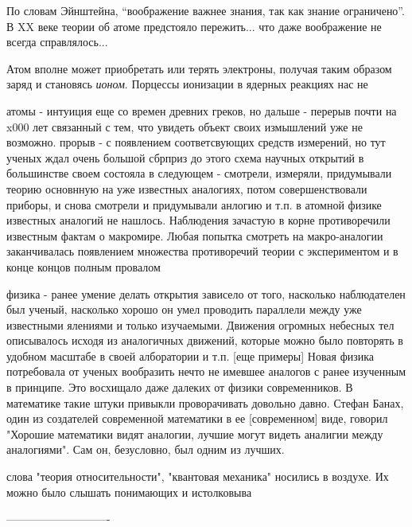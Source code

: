 По словам Эйнштейна, ``воображение важнее знания, так как знание ограничено''.
В XX веке теории об атоме предстояло пережить... что даже воображение не всегда справлялось...


Атом вполне может приобретать или терять электроны, получая таким образом заряд и становясь \textit{ионом}.
Порцессы ионизации в ядерных реакциях нас не 



атомы - интуиция еще со времен древних греков, но дальше - перерыв почти на x000 лет связанный с тем, что увидеть объект своих измышлений уже не возможно.
прорыв - с появлением соответсвующих средств измерений, но тут ученых ждал очень большой сбрприз
до этого схема научных открытий в большинстве своем состояла в следующем - смотрели, измеряли, придумывали теорию основнную на уже известных аналогиях, потом совершенствовали приборы, и снова смотрели и придумывали анлогию и т.п.
в атомной физике известных аналогий не нашлось. Наблюдения зачастую в корне противоречили известным фактам о макромире. Любая попытка смотреть на макро-аналогии заканчивалась появлением множества противоречий теории с экспериментом и в конце концов полным провалом 


физика - ранее умение делать открытия зависело от того, насколько наблюдателен был ученый, насколько хорошо он умел проводить параллели между уже известными ялениями и только изучаемыми.
Движения огромных небесных тел описывалось исходя из аналогичных движений, которые можно было повторять в удобном масштабе в своей алборатории и т.п. [еще примеры]
Новая физика потребовала от ученых вообразить нечто не имевшее аналогов с ранее изученным в принципе. 
Это восхищало даже далеких от физики современников.
В математике такие штуки привыкли проворачивать довольно давно. 
Стефан Банах, один из создателей современной математики в ее [современном] виде, говорил "Хорошие математики видят аналогии, лучшие могут видеть аналигии между аналогиями". Сам он, безусловно, был одним из лучших.

 
слова "теория относительности", "квантовая механика" носились в воздухе. Их можно было слышать  понимающих и истолковыва

----------------------------



